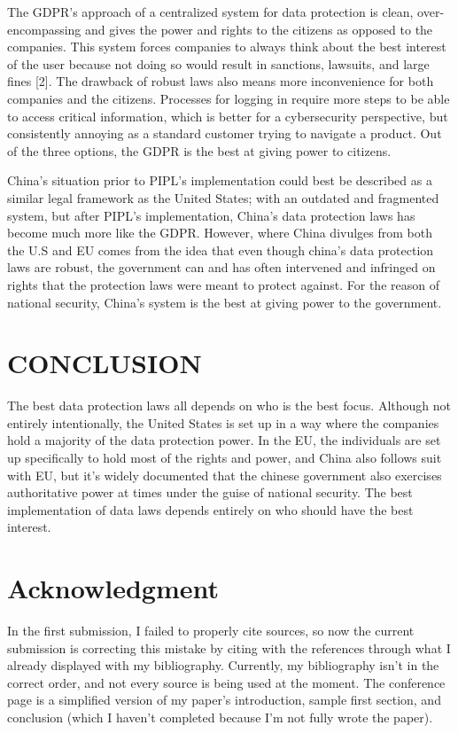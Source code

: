 \documentclass[conference]{IEEEtran}
\begin{document}
The GDPR's approach of a centralized system for data protection is clean, over-encompassing and gives the power and rights to the citizens as opposed to the companies. This system forces companies to always think about the best interest of the user because not doing so would result in sanctions, lawsuits, and large fines [2]. The drawback of robust laws also means more inconvenience for both companies and the citizens. Processes for logging in require more steps to be able to access critical information, which is better for a cybersecurity perspective, but consistently annoying as a standard customer trying to navigate a product. Out of the three options, the GDPR is the best at giving power to citizens.

China's situation prior to PIPL's implementation could best be described as a similar legal framework as the United States; with an outdated and fragmented system, but after PIPL's implementation, China's data protection laws has become much more like the GDPR. However, where China divulges from both the U.S and EU comes from the idea that even though china's data protection laws are robust, the government can and has often intervened and infringed on rights that the protection laws were meant to protect against. For the reason of national security, China's system is the best at giving power to the government. 



\section {CONCLUSION}
The best data protection laws all depends on who is the best focus. Although not entirely intentionally, the United States is set up in a way where the companies hold a majority of the data protection power. In the EU, the individuals are set up specifically to hold most of the rights and power, and China also follows suit with EU, but it's widely documented that the chinese government also exercises authoritative power at times under the guise of national security. The best implementation of data laws depends entirely on who should have the best interest. 


\section*{Acknowledgment}
In the first submission, I failed to properly cite sources, so now the current submission is correcting this mistake by citing with the references through what I already displayed with my bibliography. Currently, my bibliography isn't in the correct order, and not every source is being used at the moment. The conference page is a simplified version of my paper's introduction, sample first section, and conclusion (which I haven't completed because I'm not fully wrote the paper). 
\end{document}
